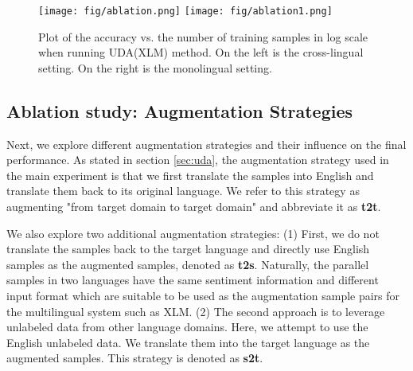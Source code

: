 \documentclass{article} \usepackage{iclr2020_conference,times}
\begin{document}
\begin{figure}
    \centering
    \texttt{[image: fig/ablation.png]}
    \texttt{[image: fig/ablation1.png]}
    \caption{Plot of the accuracy vs. the number of training samples in log scale when running UDA(XLM) method. On the left is the cross-lingual setting. On the right is the monolingual setting.}
    \label{fig:num_tr}
\end{figure}

\subsection{Ablation study: Augmentation Strategies}

Next, we explore different augmentation strategies and their influence on the final performance. 
As stated in section \ref{sec:uda}, the augmentation strategy used in the main experiment is that we first translate the samples into English and translate them back to its original language.  We refer to this strategy as augmenting "from target domain to target domain" and abbreviate it as \textbf{t2t}.
 
We also explore two additional augmentation strategies:
(1) First, we do not translate the samples back to the target language and directly use English samples as the augmented samples, denoted as \textbf{t2s}.  
Naturally, the parallel samples in two languages have the same sentiment information and different input format which are suitable to be used as the augmentation sample pairs for the multilingual system such as XLM.
(2) The second approach is to leverage unlabeled data from other language domains. 
Here, we attempt to use the English unlabeled data. We translate them into the target language as the augmented samples. This strategy is denoted as \textbf{s2t}.
\end{document}
